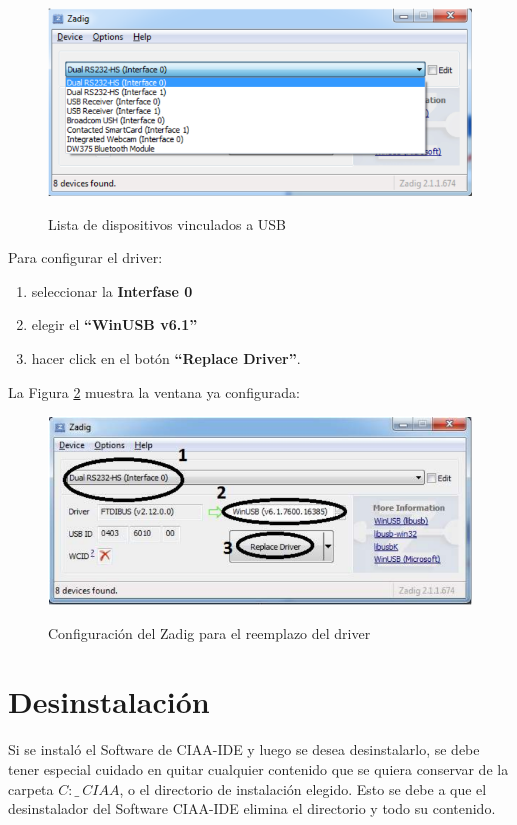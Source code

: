 \documentclass[12pt,letterpaper]{article}
\begin{document}
\begin{center}
\begin{figure}[!h]
\centering
\includegraphics[width=8 cm]{figuras/instalacion14.png}\\
\caption{Lista de dispositivos vinculados a USB}
\label{Fig16}
\end{figure}
\end{center}

Para configurar el driver:

\begin{enumerate}
\item[1]seleccionar la \textbf{Interfase 0}
\item[2]elegir el \textbf{“WinUSB v6.1”}
\item[2]hacer click en el botón \textbf{“Replace Driver”}.
\end{enumerate}

La Figura \ref{Fig17} muestra la ventana ya configurada:

\begin{center}
\begin{figure}[!h]
\centering
\includegraphics[width=8 cm]{figuras/instalacion15.png}\\
\caption{Configuración del Zadig para el reemplazo del driver}
\label{Fig17}
\end{figure}
\end{center}

\section{Desinstalación}
Si se instaló el Software de CIAA-IDE y luego se desea desinstalarlo, se debe tener especial
cuidado en quitar cualquier contenido que se quiera conservar de la carpeta $C:\_\ CIAA$, o el
directorio de instalación elegido. Esto se debe a que el desinstalador del Software CIAA-IDE
elimina el directorio y todo su contenido.
\end{document}
